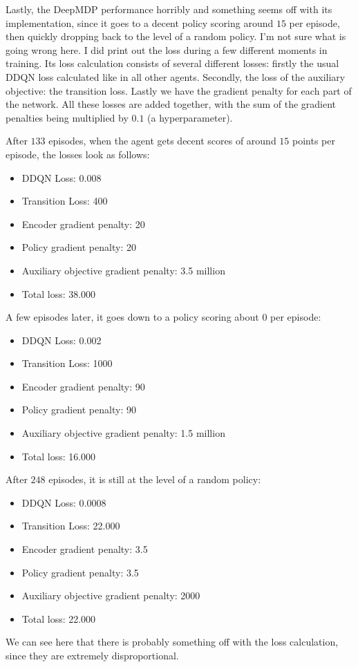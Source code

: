 Lastly, the DeepMDP performance horribly and something seems off with its implementation, since it goes to a decent policy scoring around $15$ per episode, then quickly dropping back to the level of a random policy. I'm not sure what is going wrong here. I did print out the loss during a few different moments in training. Its loss calculation consists of several different losses: firstly the usual DDQN loss calculated like in all other agents. Secondly, the loss of the auxiliary objective: the transition loss. Lastly we have the gradient penalty for each part of the network. All these losses are added together, with the sum of the gradient penalties being multiplied by $0.1$ (a hyperparameter).

After $133$ episodes, when the agent gets decent scores of around $15$ points per episode, the losses look as follows:
\begin{itemize}
\item DDQN Loss: 0.008
\item Transition Loss: 400
\item Encoder gradient penalty: 20
\item Policy gradient penalty: 20
\item Auxiliary objective gradient penalty: 3.5 million
\item Total loss: 38.000
\end{itemize}

A few episodes later, it goes down to a policy scoring about $0$ per episode:
\begin{itemize}
\item DDQN Loss: 0.002
\item Transition Loss: 1000
\item Encoder gradient penalty: 90
\item Policy gradient penalty: 90
\item Auxiliary objective gradient penalty: 1.5 million
\item Total loss: 16.000
\end{itemize}

After $248$ episodes, it is still at the level of a random policy:
\begin{itemize}
\item DDQN Loss: 0.0008 
\item Transition Loss: 22.000
\item Encoder gradient penalty: 3.5
\item Policy gradient penalty: 3.5
\item Auxiliary objective gradient penalty: 2000
\item Total loss: 22.000
\end{itemize}

We can see here that there is probably something off with the loss calculation, since they are extremely disproportional.